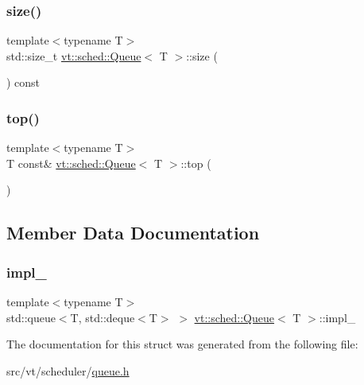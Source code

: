 \mbox{\label{structvt_1_1sched_1_1_queue_a0d5cd0a31703541be21f3bbd1590464e}} 
\subsubsection{\texorpdfstring{size()}{size()}}
{\footnotesize\ttfamily template$<$typename T$>$ \\
std\+::size\+\_\+t \hyperlink{structvt_1_1sched_1_1_queue}{vt\+::sched\+::\+Queue}$<$ T $>$\+::size (\begin{DoxyParamCaption}{ }\end{DoxyParamCaption}) const\hspace{0.3cm}{\ttfamily [inline]}}

\mbox{\label{structvt_1_1sched_1_1_queue_a636c676d2dc99d283ba3607e7ed5b390}} 
\subsubsection{\texorpdfstring{top()}{top()}}
{\footnotesize\ttfamily template$<$typename T$>$ \\
T const\& \hyperlink{structvt_1_1sched_1_1_queue}{vt\+::sched\+::\+Queue}$<$ T $>$\+::top (\begin{DoxyParamCaption}{ }\end{DoxyParamCaption})\hspace{0.3cm}{\ttfamily [inline]}}



\subsection{Member Data Documentation}
\mbox{\label{structvt_1_1sched_1_1_queue_a68cbe05570c230c55b730d8e98a1f6a5}} 
\subsubsection{\texorpdfstring{impl\+\_\+}{impl\_}}
{\footnotesize\ttfamily template$<$typename T$>$ \\
std\+::queue$<$T, std\+::deque$<$T$>$ $>$ \hyperlink{structvt_1_1sched_1_1_queue}{vt\+::sched\+::\+Queue}$<$ T $>$\+::impl\+\_\+\hspace{0.3cm}{\ttfamily [private]}}



The documentation for this struct was generated from the following file\+:\begin{DoxyCompactItemize}
\item 
src/vt/scheduler/\hyperlink{queue_8h}{queue.\+h}\end{DoxyCompactItemize}
